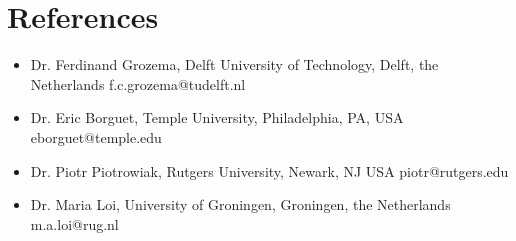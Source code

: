 \documentclass[11pt,letterpaper,sans]{moderncv} %
\begin{document}





\section {References}


\begin{itemize}
	\item Dr. Ferdinand Grozema, Delft University of Technology, Delft, the Netherlands
	      \newline f.c.grozema@tudelft.nl
	\item Dr. Eric Borguet, Temple University, Philadelphia, PA, USA 
	      \newline eborguet@temple.edu
	\item Dr. Piotr Piotrowiak, Rutgers University, Newark, NJ USA
	      \newline piotr@rutgers.edu
	\item Dr. Maria Loi, University of Groningen, Groningen, the Netherlands
	      \newline m.a.loi@rug.nl
\end{itemize}











%
%
%
%

\end{document}
